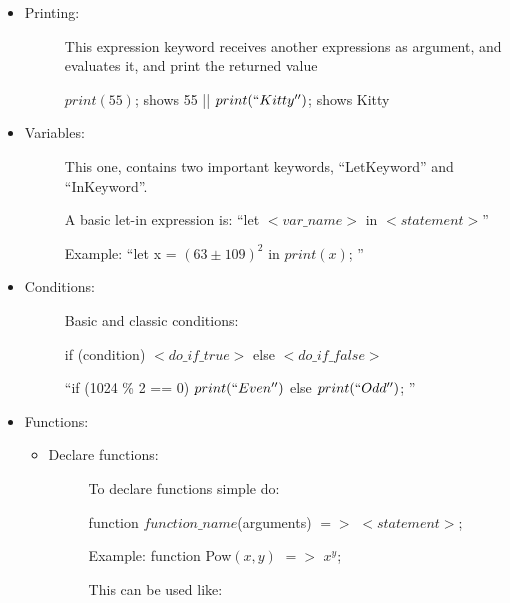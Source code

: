 \begin{itemize}
            \begin{itemize}
                \item Printing:
                    \begin{description}
                    \item[] This expression keyword receives another expressions as argument, and evaluates it, and print the returned value
                    \item[] $print(55)$; shows 55 || $print(``Kitty'')$; shows Kitty
                    \end{description}
                \item Variables:
                    \begin{description}
                        \item[] This one, contains two important keywords, ``LetKeyword'' and ``InKeyword''.
                        \item[] A basic let-in expression is: ``let $<var\_name>$ in $<statement>$''
                        \item[] Example: ``let x = ${(63 \pm 109)}^2$ in $print(x)$; ''
                    \end{description}
                \item Conditions:
                    \begin{description}
                        \item[] Basic and classic conditions:
                        \item[] if (condition) $<do\_if\_true>$ else $<do\_if\_false>$
                        \item[] ``if (1024 \% 2 == 0) $print(``Even'')$ else $print(``Odd'')$; ''
                    \end{description}
                \item Functions:
                    \begin{itemize}
                        \item Declare functions:
                        \begin{description}
                            \item[] To declare functions simple do:
                            \item[] function $function\_name${(arguments)} $=>$ $<statement>$;
                            \item[] Example: function Pow$(x,y)$ $=>$ $x^y$;
                            \item[] This can be used like:

\end{description}
\end{itemize}
\end{itemize}
\end{itemize}
